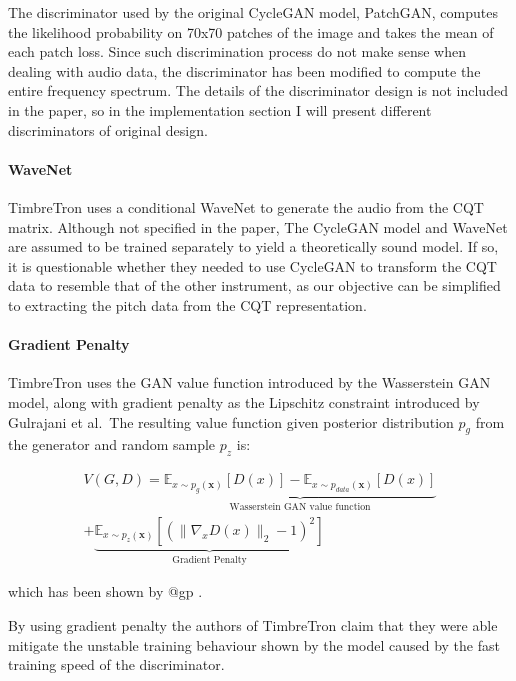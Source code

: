 \documentclass[]{report}
\begin{document}
The discriminator used by the original CycleGAN model, PatchGAN,
computes the likelihood probability on 70x70 patches of the image and
takes the mean of each patch loss. Since such discrimination process do
not make sense when dealing with audio data, the discriminator has been
modified to compute the entire frequency spectrum. The details of the
discriminator design is not included in the paper, so in the
implementation section I will present different discriminators of
original design.

\paragraph{WaveNet}

TimbreTron uses a conditional WaveNet to generate the audio from the CQT
matrix. Although not specified in the paper, The CycleGAN model and
WaveNet are assumed to be trained separately to yield a theoretically
sound model. If so, it is questionable whether they needed to use
CycleGAN to transform the CQT data to resemble that of the other
instrument, as our objective can be simplified to extracting the pitch
data from the CQT representation.

\paragraph{Gradient Penalty}

TimbreTron uses the GAN value function introduced by the Wasserstein GAN
model, along with gradient penalty as the Lipschitz constraint
introduced by Gulrajani et al.~The resulting value function given
posterior distribution \(p_g\) from the generator and random sample
\(p_z\) is:

\begin{multline}
    V(G, D) = \underbrace{
        \mathbb{E}_{x \sim p_{g}(\mathbf{x})} [D(x)] - \mathbb{E}_{x \sim p_{data}(\mathbf{x})} [D(x)]
        }_\textrm{Wasserstein GAN value function} \\ +
        \underbrace{
            \mathbb{E}_{x \sim p_z(\mathbf{x})} [(\| \nabla_x D(x) \|_2 - 1)^2]
        }_\textrm{Gradient Penalty} 
\end{multline}

which has been shown by @gp .

By using gradient penalty the authors of TimbreTron claim that they were
able mitigate the unstable training behaviour shown by the model caused
by the fast training speed of the discriminator.
\end{document}
